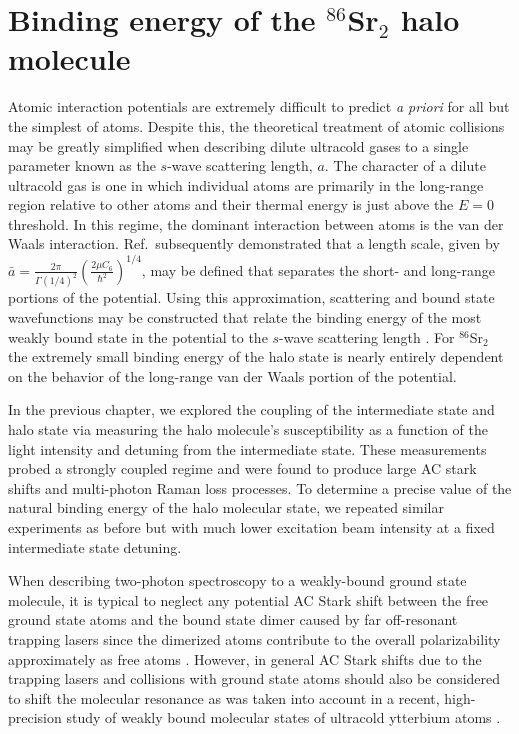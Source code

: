 \chapter{Binding energy of the $^{86}$Sr$_2$ halo molecule} \label{ch:chap5}
Atomic interaction potentials are extremely difficult to predict \textit{a priori} for all but the simplest of atoms.
Despite this, the theoretical treatment of atomic collisions may be greatly simplified when describing dilute ultracold gases to a single parameter known as the $s$-wave scattering length, $a$.
The character of a dilute ultracold gas is one in which individual atoms are primarily in the long-range region relative to other atoms and their thermal energy is just above the $E=0$ threshold. 
In this regime, the dominant interaction between atoms is the van der Waals interaction.
Ref.\,\cite{gfl93} subsequently demonstrated that a length scale, given by $\bar{a}=\frac{2 \pi}{\Gamma(1/4)^2} \left( \frac{2 \mu C_6}{\hbar^2} \right)^{1/4}$, may be defined that separates the short- and long-range portions of the potential.
Using this approximation, scattering and bound state wavefunctions may be constructed that relate the binding energy of the most weakly bound state in the potential to the $s$-wave scattering length \cite{fks96,gao04,Julienne2006}.
For $^{86}$Sr$_2$ the extremely small binding energy of the halo state is nearly entirely dependent on the behavior of the long-range van der Waals portion of the potential.

In the previous chapter, we explored the coupling of the intermediate state and halo state via measuring the halo molecule's susceptibility as a function of the light intensity and detuning from the intermediate state.
These measurements probed a strongly coupled regime and were found to produce large AC stark shifts and multi-photon Raman loss processes. 
To determine a precise value of the natural binding energy of the halo molecular state, we repeated similar experiments as before but with much lower excitation beam intensity at a fixed intermediate state detuning.

When describing two-photon spectroscopy to a weakly-bound ground state molecule, it is typical to neglect any potential AC Stark shift between the free ground state atoms and the bound state dimer caused by far off-resonant trapping lasers since the dimerized atoms contribute to the overall polarizability approximately as free atoms \cite{Jones2006}.
However, in general AC Stark shifts due to the trapping lasers and collisions with ground state atoms should also be considered to shift the molecular resonance as was taken into account in a recent, high-precision study of weakly bound molecular states of ultracold ytterbium atoms \cite{bbc17}.

